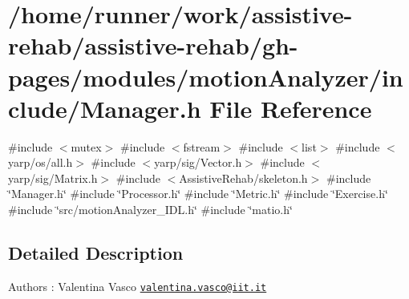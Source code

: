 \section{/home/runner/work/assistive-\/rehab/assistive-\/rehab/gh-\/pages/modules/motion\+Analyzer/include/\+Manager.h File Reference}
\label{Manager_8h}
{\ttfamily \#include $<$mutex$>$}\newline
{\ttfamily \#include $<$fstream$>$}\newline
{\ttfamily \#include $<$list$>$}\newline
{\ttfamily \#include $<$yarp/os/all.\+h$>$}\newline
{\ttfamily \#include $<$yarp/sig/\+Vector.\+h$>$}\newline
{\ttfamily \#include $<$yarp/sig/\+Matrix.\+h$>$}\newline
{\ttfamily \#include $<$Assistive\+Rehab/skeleton.\+h$>$}\newline
{\ttfamily \#include \char`\"{}Manager.\+h\char`\"{}}\newline
{\ttfamily \#include \char`\"{}Processor.\+h\char`\"{}}\newline
{\ttfamily \#include \char`\"{}Metric.\+h\char`\"{}}\newline
{\ttfamily \#include \char`\"{}Exercise.\+h\char`\"{}}\newline
{\ttfamily \#include \char`\"{}src/motion\+Analyzer\+\_\+\+I\+D\+L.\+h\char`\"{}}\newline
{\ttfamily \#include \char`\"{}matio.\+h\char`\"{}}\newline


\subsection{Detailed Description}
\begin{DoxyAuthor}{Authors}
\+: Valentina Vasco \href{mailto:valentina.vasco@iit.it}{\tt valentina.\+vasco@iit.\+it} 
\end{DoxyAuthor}

